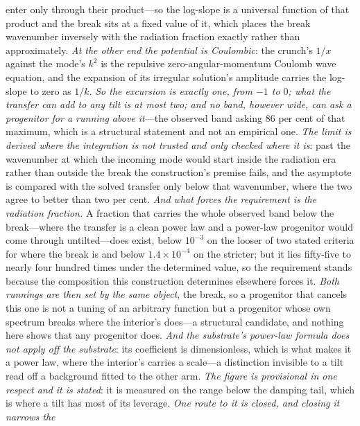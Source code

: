 \documentclass[11pt,a4paper]{article}
\theoremstyle{plain}
\theoremstyle{definition}
\theoremstyle{remark}
\begin{document}
\begin{enumerate}
enter only through their product---so the log-slope is a universal function of that product and the break
sits at a fixed value of it, which places the break wavenumber inversely with the radiation fraction
exactly rather than approximately. \emph{At the other end the potential is Coulombic}: the crunch's $1/x$
against the mode's $k^{2}$ is the repulsive zero-angular-momentum Coulomb wave equation, and the expansion
of its irregular solution's amplitude carries the log-slope to zero as $1/k$. \emph{So the excursion is
exactly one, from $-1$ to $0$; what the transfer can add to any tilt is at most two; and no band, however
wide, can ask a progenitor for a running above it}---the observed band asking $86$ per cent of that
maximum, which is a structural statement and not an empirical one. \emph{The limit is derived where the
integration is not trusted and only checked where it is}: past the wavenumber at which the incoming mode
would start inside the radiation era rather than outside the break the construction's premise fails, and
the asymptote is compared with the solved transfer only below that wavenumber, where the two agree to
better than two per cent. \emph{And what forces the requirement is the radiation fraction.} A fraction
that carries the whole observed band below the break---where the transfer is a clean power law and a
power-law progenitor would come through untilted---does exist, below $10^{-3}$ on the looser of two stated
criteria for where the break is and below $1.4\times10^{-4}$ on the stricter; but it lies fifty-five to
nearly four hundred times under the determined value, so the requirement stands because the composition
this construction determines elsewhere forces it. \emph{Both runnings are then set by the same object},
the break, so a progenitor that cancels this one is not a tuning of an arbitrary function but a progenitor
whose own spectrum breaks where the interior's does---a structural candidate, and nothing here shows that
any progenitor
does.
\emph{And the substrate's power-law formula does not apply off the substrate}: its
coefficient is dimensionless, which is what makes it a power law, where the interior's carries a scale---a distinction invisible to a tilt read off a background fitted to the other arm. \emph{The figure is provisional in one respect and it is stated}: it is measured on the range below the damping tail, which is where a tilt has most of its leverage. \emph{One route to it is closed, and closing it narrows the
}
\end{enumerate}
\end{document}
